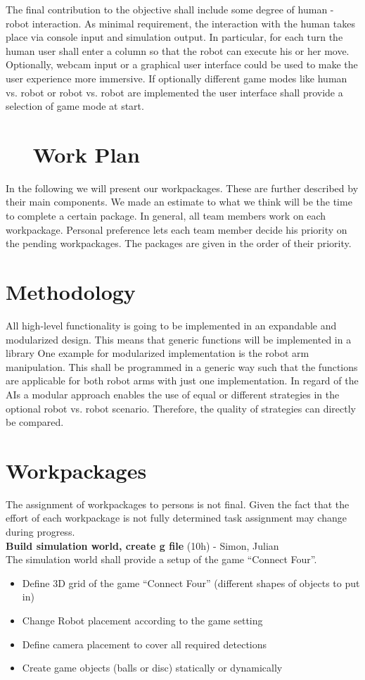 \documentclass[11pt,pdftex,a4paper]{article}
\newcounter{exnum}
\newcommand{\ex}[1]{\section*{\theexnum $\quad$ #1 \stepcounter{exnum}}}
\begin{document}
	The final contribution to the objective shall include some degree of human - robot interaction.
	As minimal requirement, the interaction with the human takes place via console input and simulation output. 
	In particular, for each turn the human user shall enter a column so that the robot can execute his or her move. 
	Optionally, webcam input or a graphical user interface could be used to make the user experience more immersive. 
	If optionally different game modes like human vs. robot or robot vs. robot are implemented the user interface shall provide a selection of game mode at start.

   
	\ex{Work Plan}
	In the following we will present our workpackages.
	These are further described by their main components.
	We made an estimate to what we think will be the time to complete a certain package.
	In general, all team members work on each workpackage.
	Personal preference lets each team member decide his priority on the pending workpackages.
	The packages are given in the order of their priority.

	\section*{Methodology}
	All high-level functionality is going to be implemented in an expandable and modularized design.
	This means that generic functions will be implemented in a library
	One example for modularized implementation is the robot arm manipulation. 
	This shall be programmed in a generic way such that the functions are applicable for both robot arms with just one implementation.
	In regard of the AIs a modular approach enables the use of equal or different strategies in the optional robot vs. robot scenario.
	Therefore, the quality of strategies can directly be compared.

	\section*{Workpackages}
	The assignment of workpackages to persons is not final. 
	Given the fact that the effort of each workpackage is not fully determined task assignment may change during progress.
	\\

	\noindent
	\textbf{Build simulation world, create g file} (10h) - Simon, Julian\\
	The simulation world shall provide a setup of the game ``Connect Four''.
	\begin{itemize}
	\item Define 3D grid of the game ``Connect Four'' (different shapes of objects to put in)
	\item Change Robot placement according to the game setting
	\item Define camera placement to cover all required detections
	\item Create game objects (balls or disc) statically or dynamically	
	\end{itemize}
	
\end{document}
